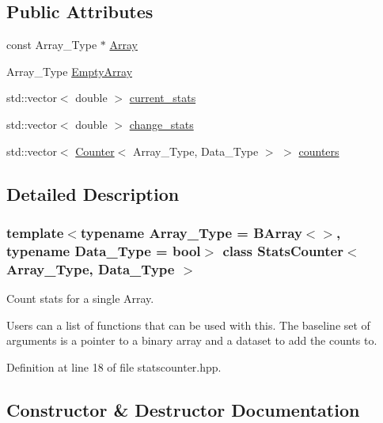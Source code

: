\subsection*{Public Attributes}
\begin{DoxyCompactItemize}
\item 
const Array\+\_\+\+Type $\ast$ \hyperlink{class_stats_counter_aa826cd748cd3b1a57cbec52424285485}{Array}
\item 
Array\+\_\+\+Type \hyperlink{class_stats_counter_a026304bec607994865ba5bb4e18f9104}{Empty\+Array}
\item 
std\+::vector$<$ double $>$ \hyperlink{class_stats_counter_af98192f893280a2681a59f4b73051ca3}{current\+\_\+stats}
\item 
std\+::vector$<$ double $>$ \hyperlink{class_stats_counter_a42c926799d8cb0abc6f5a1cfbc073f69}{change\+\_\+stats}
\item 
std\+::vector$<$ \hyperlink{class_counter}{Counter}$<$ Array\+\_\+\+Type, Data\+\_\+\+Type $>$ $>$ \hyperlink{class_stats_counter_a733af6010857d84c74853be3d61610cf}{counters}
\end{DoxyCompactItemize}


\subsection{Detailed Description}
\subsubsection*{template$<$typename Array\+\_\+\+Type = B\+Array$<$$>$, typename Data\+\_\+\+Type = bool$>$\newline
class Stats\+Counter$<$ Array\+\_\+\+Type, Data\+\_\+\+Type $>$}

Count stats for a single Array. 

Users can a list of functions that can be used with this. The baseline set of arguments is a pointer to a binary array and a dataset to add the counts to. 

Definition at line 18 of file statscounter.\+hpp.



\subsection{Constructor \& Destructor Documentation}
\mbox{\label{class_stats_counter_a4479dd3e037f04c7ece27e136afe24ad}} 
